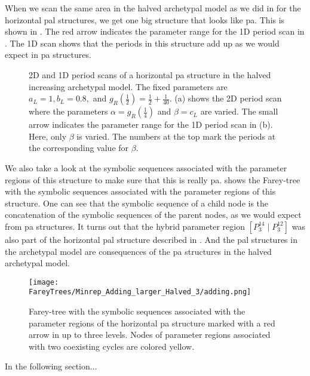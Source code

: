 When we scan the same area in the halved archetypal model as we did in  for the horizontal \gls{pal} structures, we get one big structure that looks like \gls{pa}.
This is shown in .
The red arrow indicates the parameter range for the 1D period scan in .
The 1D scan shows that the periods in this structure add up as we would expect in \gls{pa} structures.

\begin{figure}
	\centering
	\caption[2D and 1D period scans of a horizontal period-adding structure in the halved increasing archetypal model]{
		2D and 1D period scans of a horizontal \gls{pa} structure in the halved increasing archetypal model.
		The fixed parameters are $a_L = 1, b_L = 0.8,$ and $g_R\left(\frac{1}{2}\right) = \frac{1}{2} + \frac{1}{40}$.
		(a) shows the 2D period scan where the parameters $\alpha = g_R\left(\frac{1}{4}\right)$ and $\beta = c_L$ are varied.
		The small arrow indicates the parameter range for the 1D period scan in (b).
		Here, only $\beta$ is varied.
		The numbers at the top mark the periods at the corresponding value for $\beta$.
	}
	\label{fig:add.add.halved.hor}
\end{figure}

We also take a look at the symbolic sequences associated with the parameter regions of this structure to make sure that this is really \gls{pa}.
 shows the Farey-tree with the symbolic sequences associated with the parameter regions of this structure.
One can see that the symbolic sequence of a child node is the concatenation of the symbolic sequences of the parent nodes, as we would expect from \gls{pa} structures.
It turns out that the hybrid parameter region $\left[P^{14}_3 \mid P^{12}_3\right]$ was also part of the horizontal \gls{pal} structure described in .
And the \gls{pal} structures in the archetypal model are consequences of the \gls{pa} structures in the halved archetypal model.

\begin{figure}
	\centering
	\texttt{[image: FareyTrees/Minrep\_Adding\_larger\_Halved\_3/adding.png]}
	\caption[Farey-tree with the symbolic sequences of a horizontal  structure]{
		Farey-tree with the symbolic sequences associated with the parameter regions of the horizontal \gls{pa} structure marked with a red arrow in  up to three levels.
		Nodes of parameter regions associated with two coexisting cycles are colored yellow.
	}
	\label{fig:add:add.halved.hor.tree}
\end{figure}

In the following section...
